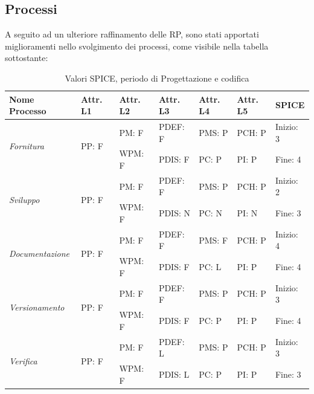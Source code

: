 \documentclass[openany,12pt,a4paper]{report}
\begin{document}
\subsection{Processi}

A seguito ad un ulteriore raffinamento delle RP, sono stati apportati miglioramenti nello svolgimento dei processi, come visibile nella tabella sottostante:

\newpage

\begin{table}[h]
	\begin{center}
		\setlength\LTleft{-22mm}
		\begin{longtable}{|p{35mm}|p{20mm}|p{20mm}|p{20mm}|p{20mm}|p{20mm}|p{20mm}|}
			\hline
			\textbf{Nome Processo} & \textbf{Attr. L1} & \textbf{Attr. L2} & \textbf{Attr. L3} & \textbf{Attr. L4} & \textbf{Attr. L5} & \textbf{SPICE}\\
			\hline
			\multirow{2}{*}{\textit{Fornitura}} & \multirow{2}{*}{PP: F} & PM: F & PDEF: F & PMS: P & PCH: P & Inizio: 3\\  
			\cline{3-7}
			&          & WPM: F & PDIS: F & PC: P & PI: P & Fine: 4 \\ 
			\hline
			\multirow{2}{*}{\textit{Sviluppo}} & \multirow{2}{*}{PP: F} & PM: F & PDEF: F & PMS: P & PCH: P & Inizio: 2\\  \cline{3-7}
			&          & WPM: F & PDIS: N & PC: N & PI: N & Fine: 3\\
			\hline\multirow{2}{*}{\textit{Documentazione}} & \multirow{2}{*}{PP: F} & PM: F & PDEF: F & PMS: F & PCH: P & Inizio: 4\\  \cline{3-7}
			&          & WPM: F & PDIS: F & PC: L & PI: P & Fine: 4\\ 
			\hline\multirow{2}{*}{\textit{Versionamento}} & \multirow{2}{*}{PP: F} & PM: F & PDEF: F & PMS: P & PCH: P & Inizio: 3\\  \cline{3-7}
			&          & WPM: F & PDIS: F & PC: P & PI: P & Fine: 4\\ 
			\hline\multirow{2}{*}{\textit{Verifica}} & \multirow{2}{*}{PP: F} & PM: F & PDEF: L & PMS: P & PCH: P & Inizio: 3\\  \cline{3-7}
			&          & WPM: F & PDIS: L & PC: P & PI: P & Fine: 3\\ 
			\hline       
		\end{longtable}
	\end{center}
	\caption{Valori SPICE, periodo di Progettazione e codifica} 
\end{table}
\end{document}
